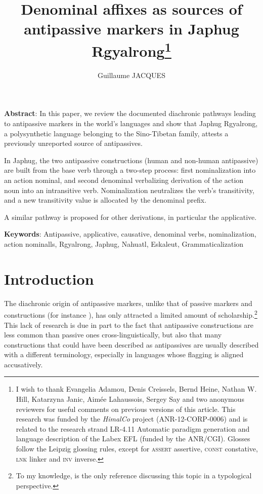 \documentclass[oldfontcommands,oneside,a4paper,11pt]{article}
\begin{document}
 


\title{Denominal affixes as sources of antipassive markers in Japhug Rgyalrong\footnote{I wish to thank  Evangelia Adamou, Denis Creissels, Bernd Heine, Nathan W. Hill, Katarzyna Janic,  Aimée Lahaussois, Sergey Say  and two anonymous reviewers for useful comments on previous versions of this article. This research was funded by the \textit{HimalCo} project (ANR-12-CORP-0006) and  is related to the research strand LR-4.11  Automatic paradigm generation and language description of the Labex EFL (funded by the ANR/CGI). Glosses follow the Leipzig glossing rules, except for \textsc{assert}  assertive, \textsc{const} constative, \textsc{lnk}  linker and \textsc{inv} inverse. } } 

\author{Guillaume JACQUES}
\maketitle
 
\textbf{Abstract}: In this paper, we review the documented diachronic pathways leading to antipassive markers in the world's languages  and show that Japhug Rgyalrong, a polysynthetic language belonging to the Sino-Tibetan family, attests a previously unreported source of antipassives. 

In Japhug, the two antipassive constructions (human and non-human antipassive) are built from the base verb through a two-step process: first nominalization into an action nominal, and second denominal verbalizing derivation of the action noun into an intransitive verb. Nominalization neutralizes the verb's   transitivity, and a new transitivity value is allocated by the denominal prefix. 

A similar pathway is proposed for other derivations, in particular the applicative.


\textbf{Keywords}: Antipassive, applicative, causative, denominal verbs, nominalization, action nominalls, Rgyalrong, Japhug, Nahuatl, Eskaleut, Grammaticalization


 \section{Introduction}
 
The diachronic origin of antipassive markers, unlike that of passive markers and constructions (for instance \citealt{haspelmath90passive}), has only attracted a limited amount of scholarship.\footnote{To my knowledge, \citet[99-375]{say09antipassive} is the only reference   discussing this topic in a typological perspective.} This lack of research is due in part to the fact that antipassive constructions are less common than passive ones cross-linguistically, but also that many constructions that could have been described as antipassives are usually described with a different terminology, especially in languages whose flagging is aligned accusatively.
\end{document}
